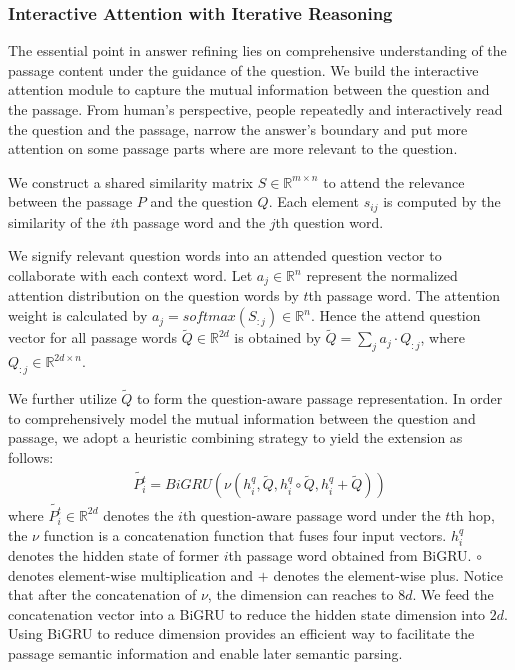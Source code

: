 \documentclass[letterpaper]{article} \usepackage{aaai18}  \usepackage{times}  \usepackage{helvet}  \usepackage{courier}  \usepackage{url}  \usepackage{graphicx}  \usepackage{booktabs}
\begin{document}
 \subsubsection{Interactive Attention with Iterative Reasoning} 
 The essential point in answer refining lies on comprehensive understanding of the passage content under the guidance of the question. We build the interactive attention module to capture the mutual information between the question and the passage. From human's perspective, people repeatedly and interactively read the question and the passage, narrow the answer's boundary and put more attention on some passage parts where are more relevant to the question. 
 
 We construct a shared similarity matrix $S\in \mathbb{R}^{m\times n}$ to attend the relevance between the passage $P$ and the question $Q$. Each element $s_{ij}$ is computed by the similarity of the $i$th passage word and the $j$th question word. 

 We signify relevant question words into an attended question vector to collaborate with each context word. Let $a_j\in \mathbb{R}^n$ represent the normalized attention distribution on the question words by $t$th passage word. The attention weight is calculated by $a_j=softmax(S_{:j})\in \mathbb{R}^n$. Hence the attend question vector for all passage words $\widetilde{Q} \in \mathbb{R}^{2d}$ is obtained by $\widetilde{Q}=\sum_j a_j \cdot{Q_{:j}}$, where $Q_{:j} \in \mathbb{R}^{2d \times n}$.

We further utilize $\widetilde{Q}$ to form the question-aware passage representation. In order to comprehensively model the mutual information between the question and passage, we adopt a heuristic combining strategy to yield the extension as follows:
\begin{align*}
\widetilde{P_i^t}=BiGRU(\nu(h_i^q,\widetilde{Q},h_i^q \circ \widetilde{Q}, h_i^q + \widetilde{Q}) ) \tag{7}
\end{align*}
where $\widetilde{P_i^t}\in \mathbb{R}^{2d}$ denotes the $i$th question-aware passage word under the $t$th hop, the $\nu$ function is a concatenation function that fuses four input vectors. $h_i^q$ denotes the hidden state of former $i$th passage word obtained from BiGRU. $\circ$ denotes element-wise multiplication and $+$ denotes the element-wise plus. Notice that after the concatenation of $\nu$, the dimension can reaches to $8d$. We feed the concatenation vector into a BiGRU to reduce the hidden state dimension into $2d$. Using BiGRU to reduce dimension provides an efficient way to facilitate the passage semantic information and enable later semantic parsing.
\end{document}
